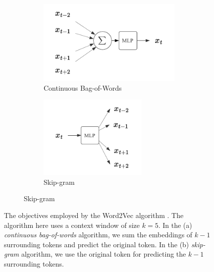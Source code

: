 {\begin{figure}[ht]
    \begin{subfigure}{\textwidth}
        \centering
        \begin{subfigure}{0.45\textwidth}
            \centering
            \includegraphics[width=\textwidth]{img/skipgram.pdf}
            \caption{Continuous Bag-of-Words}
            \label{fig:cbow}
        \end{subfigure}
        \hspace{-20px}
        \begin{subfigure}{0.45\textwidth}
            \centering
            \includegraphics[width=0.75\textwidth]{img/cbow.pdf}
            \caption{Skip-gram}
            \label{fig:skipgram}
        \end{subfigure}
    \end{subfigure}
    \caption{The objectives employed by the Word2Vec algorithm \cite{mikolov2013distributed}. The algorithm here uses a context window of size $k=5$. In the (a) \emph{continuous bag-of-words} algorithm, we sum the embeddings of $k-1$ surrounding tokens and predict the original token. In the (b) \emph{skip-gram} algorithm, we use the original token for predicting the $k-1$ surrounding tokens.}
    \label{fig:word2vec}
\end{figure}

}
